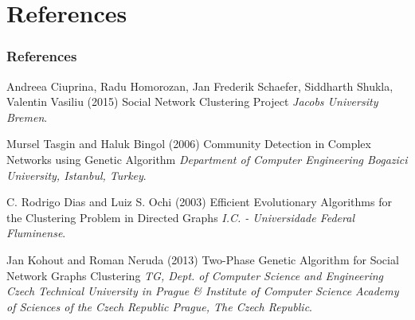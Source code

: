 \documentclass{beamer}
\begin{document}
\section{References}
\begin{frame}
\frametitle{References}
\footnotesize{
\begin{thebibliography}{99} %
 Andreea Ciuprina, Radu Homorozan, Jan Frederik Schaefer, Siddharth Shukla, Valentin Vasiliu (2015)
\newblock Social Network Clustering Project
\newblock \emph{Jacobs University Bremen}.

 Mursel Tasgin and Haluk Bingol (2006)
\newblock Community Detection in Complex Networks using Genetic Algorithm
\newblock \emph{Department of Computer Engineering
Bogazici University, Istanbul, Turkey}.

 C. Rodrigo Dias and Luiz S. Ochi (2003)
\newblock Efficient Evolutionary Algorithms for the Clustering Problem in Directed Graphs
\newblock \emph{I.C. - Universidade Federal Fluminense}.


 Jan Kohout and Roman Neruda (2013)
\newblock Two-Phase Genetic Algorithm for Social Network Graphs Clustering
\newblock \emph{TG, Dept. of Computer Science and Engineering
Czech Technical University in Prague \& Institute of Computer Science
Academy of Sciences of the Czech Republic
Prague, The Czech Republic}.
\end{thebibliography}
}
\end{frame}

\end{document}
